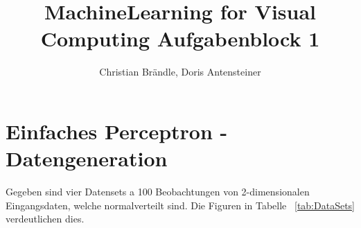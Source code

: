 \documentclass[]{report}
\title{MachineLearning for Visual Computing Aufgabenblock 1}
\author{Christian Br\"andle, Doris Antensteiner}
\begin{document}
\maketitle

\begin{abstract}
\end{abstract}

\section{Einfaches Perceptron - Datengeneration}


Gegeben sind vier Datensets a 100 Beobachtungen von 2-dimensionalen Eingangsdaten, welche normalverteilt sind. Die Figuren in Tabelle ~\ref{tab:DataSets} verdeutlichen dies.
\end{document}
